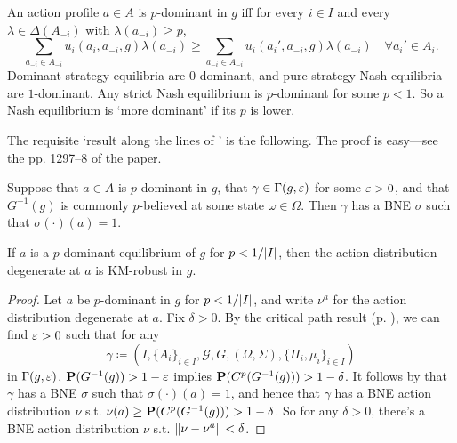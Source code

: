 \documentclass[11pt,letterpaper,reqno,oneside]{article}
\begin{document}
An action profile $a \in A$ is $p$-dominant in $g$ iff for every $i \in I$ and every $\lambda \in \Delta(A_{-i})$ with $\lambda(a_{-i}) \geq p$,
%
\begin{equation*}
	\sum_{a_{-i} \in A_{-i}} u_i(a_i,a_{-i},g) \lambda(a_{-i})
	\geq \sum_{a_{-i} \in A_{-i}} u_i(a_i',a_{-i},g) \lambda(a_{-i})
	\quad\forall a_i' \in A_i .
\end{equation*}
%
Dominant-strategy equilibria are $0$-dominant, and pure-strategy Nash equilibria are $1$-dominant. Any strict Nash equilibrium is $p$-dominant for some $p<1$.
So a Nash equilibrium is `more dominant' if its $p$ is lower.


The requisite `result along the lines of ' is the following. The proof is easy---see the pp. 1297--8 of the paper.
%
\begin{lemma}
	\label{lemma:KM_p_dom}
	Suppose that $a \in A$ is $p$-dominant in $g$, that $\gamma \in \Gamma(g,\eps)$ for some $\eps>0$, and that $G^{-1}(g)$ is commonly $p$-believed at some state $\omega \in \Omega$. Then $\gamma$ has a BNE $\sigma$ such that $\sigma(\cdot)(a)=1$.
\end{lemma}

\begin{proposition}[$p$-dominant]
	\label{proposition:KM_p_dom}
	If $a$ is a $p$-dominant equilibrium of $g$ for $p<1/\abs*{I}$, then the action distribution degenerate at $a$ is KM-robust in $g$.
\end{proposition}

\begin{proof}
	Let $a$ be $p$-dominant in $g$ for $p<1/\abs*{I}$, and write $\nu^a$ for the action distribution degenerate at $a$. Fix $\delta>0$. By the critical path result (p. \pageref{theorem:MS_Cp_properties_1/2}), we can find $\eps>0$ such that for any
	\begin{equation*}
		\gamma \coloneqq \left(
		I, \{ A_i \}_{i \in I}, \mathcal{G}, G, (\Omega,\Sigma), \{\Pi_i,\mu_i\}_{i \in I}
		\right)
	\end{equation*}
	in $\Gamma(g,\eps)$, $\PP(G^{-1}(g)) > 1-\eps$ implies $\PP(C^p(G^{-1}(g))) > 1-\delta$. It follows by  that $\gamma$ has a BNE $\sigma$ such that $\sigma(\cdot)(a)=1$, and hence that $\gamma$ has a BNE action distribution $\nu$ s.t. $\nu(a) \geq \PP(C^p(G^{-1}(g))) > 1-\delta$. So for any $\delta>0$, there's a BNE action distribution $\nu$ s.t. $\norm*{ \nu - \nu^a } < \delta$.
\end{proof}
\end{document}
